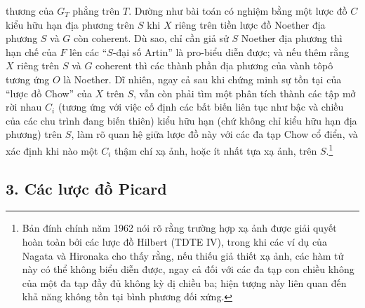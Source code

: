 thương của $G_T$ phẳng trên $T$. Dường như bài toán có nghiệm bằng một lược đồ
$C$ kiểu hữu hạn địa phương trên $S$ khi $X$ riêng trên tiền lược đồ Noether
địa phương $S$ và $G$ còn coherent. Dù sao, chỉ cần giả sử $S$ Noether địa
phương thì hạn chế của $F$ lên các ``$S$-đại số Artin'' là pro-biểu diễn được;
và nếu thêm rằng $X$ riêng trên $S$ và $G$ coherent thì các thành phần địa
phương của vành tôpô tương ứng $O$ là Noether. Dĩ nhiên, ngay cả sau khi chứng
minh sự tồn tại của ``lược đồ Chow'' của $X$ trên $S$, vẫn còn phải tìm một
phân tích thành các tập mở rời nhau $C_i$ (tương ứng với việc cố định các bất
biến liên tục như bậc và chiều của các chu trình đang biến thiên) kiểu hữu hạn
(chứ không chỉ kiểu hữu hạn địa phương) trên $S$, làm rõ quan hệ giữa lược đồ
này với các đa tạp Chow cổ điển, và xác định khi nào một $C_i$ thậm chí xạ ảnh,
hoặc ít nhất tựa xạ ảnh, trên $S$.\footnote{Bản đính chính năm 1962 nói rõ rằng
trường hợp xạ ảnh được giải quyết hoàn toàn bởi các lược đồ Hilbert (TDTE IV),
trong khi các ví dụ của Nagata và Hironaka cho thấy rằng, nếu thiếu giả thiết
xạ ảnh, các hàm tử này có thể không biểu diễn được, ngay cả đối với các đa tạp
con chiều không của một đa tạp đầy đủ không kỳ dị chiều ba; hiện tượng này liên
quan đến khả năng không tồn tại bình phương đối xứng.}

\subsection*{3. Các lược đồ Picard}

